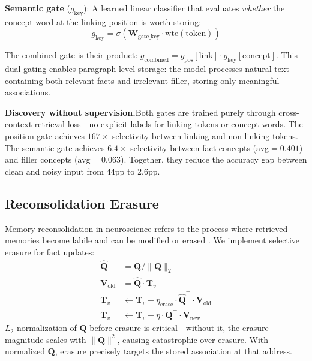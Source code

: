 \documentclass[11pt,a4paper]{article}
\begin{document}
\textbf{Semantic gate} ($g_{\text{key}}$): A learned linear classifier that evaluates \emph{whether} the concept word at the linking position is worth storing:
\begin{equation}
  g_{\text{key}} = \sigma(\mathbf{W}_{\text{gate\_key}} \cdot \text{wte}(\text{token}))
  \label{eq:sem_gate}
\end{equation}

The combined gate is their product: $g_{\text{combined}} = g_{\text{pos}}[\text{link}] \cdot g_{\text{key}}[\text{concept}]$. This dual gating enables paragraph-level storage: the model processes natural text containing both relevant facts and irrelevant filler, storing only meaningful associations.

\textbf{Discovery without supervision.}\quad Both gates are trained purely through cross-context retrieval loss---no explicit labels for linking tokens or concept words. The position gate achieves $167\times$ selectivity between linking and non-linking tokens. The semantic gate achieves $6.4\times$ selectivity between fact concepts (avg${=}0.401$) and filler concepts (avg${=}0.063$). Together, they reduce the accuracy gap between clean and noisy input from 44pp to 2.6pp.

\subsection{Reconsolidation Erasure}

Memory reconsolidation in neuroscience refers to the process where retrieved memories become labile and can be modified or erased \citep{nader2000fear}. We implement selective erasure for fact updates:
\begin{align}
  \hat{\mathbf{Q}} &= \mathbf{Q} / \|\mathbf{Q}\|_2 \label{eq:q_norm} \\
  \mathbf{V}_{\text{old}} &= \hat{\mathbf{Q}} \cdot \mathbf{T}_v \label{eq:retrieve_old} \\
  \mathbf{T}_v &\leftarrow \mathbf{T}_v - \eta_{\text{erase}} \cdot \hat{\mathbf{Q}}^\top \cdot \mathbf{V}_{\text{old}} \label{eq:erase} \\
  \mathbf{T}_v &\leftarrow \mathbf{T}_v + \eta \cdot \mathbf{Q}^\top \cdot \mathbf{V}_{\text{new}} \label{eq:write_new}
\end{align}
$L_2$ normalization of $\mathbf{Q}$ before erasure is critical---without it, the erasure magnitude scales with $\|\mathbf{Q}\|^2$, causing catastrophic over-erasure. With normalized $\mathbf{Q}$, erasure precisely targets the stored association at that address.
\end{document}

